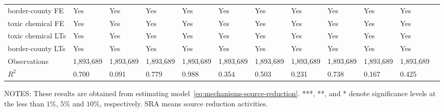 \begin{table}[H]
{\begin{tabular}{@{}llllllllllll@{}}
            border-county FE      & Yes       & Yes             & Yes        & Yes                   & Yes            & Yes       & Yes           & Yes       & Yes                 & Yes                 \\
            toxic chemical FE     & Yes       & Yes             & Yes        & Yes                   & Yes            & Yes       & Yes           & Yes       & Yes                 & Yes                 \\
            toxic chemical LTs    & Yes       & Yes             & Yes        & Yes                   & Yes            & Yes       & Yes           & Yes       & Yes                 & Yes                 \\
            border-county LTs     & Yes       & Yes             & Yes        & Yes                   & Yes            & Yes       & Yes           & Yes       & Yes                 & Yes                 \\ \midrule
            Observations          & 1,893,689 & 1,893,689       & 1,893,689  & 1,893,689             & 1,893,689      & 1,893,689 & 1,893,689      & 1,893,689 & 1,893,689           & 1,893,689           \\
            $R^2$                 & 0.700     & 0.091           & 0.779      & 0.988                 & 0.354          & 0.503     & 0.231         & 0.738     & 0.167               & 0.425               \\ \bottomrule\bottomrule
        \end{tabular}%
    }
    \begin{minipage}{\columnwidth}
        \vspace{0.05in}
        \tiny NOTES: These results are obtained from estimating model~\ref{eq:mechanisms-source-reduction}. ***, **, and * denote significance levels at the less than $1\%$, $5\%$ and $10\%$, respectively. SRA means source reduction activities.
    \end{minipage}
\end{table}
